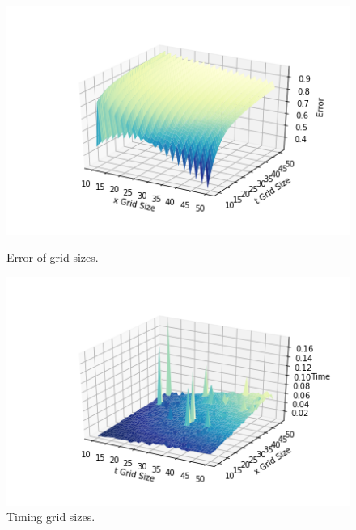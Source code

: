 \documentclass[12pt, oneside]{book}
\theoremstyle{plain}
\theoremstyle{definition}
\begin{document}
\begin{figure}[!htb]
  \begin{minipage}[b]{0.5\textwidth}
    \includegraphics[width=\textwidth]{BSExplicitGridError.png}
    \caption{Error of grid sizes.}
  \end{minipage}
  \begin{minipage}[b]{0.5\textwidth}
    \includegraphics[width=\textwidth]{BSExplicitGridTimer.png}
    \caption{Timing grid sizes.}
  \end{minipage}
\end{figure}
\end{document}
